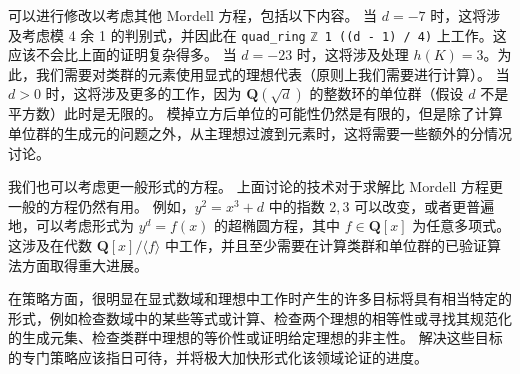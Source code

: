 \documentclass[sigplan,10pt,nonacm,
screen]{acmart} \settopmatter{printfolios=true,printccs=false,printacmref=false}
\newcommand{\ab}[1]{\todo[color=green]{AB: #1}}
\newcommand{\QQ}{\mathbf{Q}}
\newcommand{\ZZ}{\mathbf{Z}}
\begin{document}
可以进行修改以考虑其他 Mordell 方程，包括以下内容。
%
%
当 $d = -7$ 时，这将涉及考虑模 4 余 1 的判别式，并因此在 \lstinline{quad_ring} %
\lstinline{ℤ 1 ((d - 1) / 4)} 上工作。这应该不会比上面的证明复杂得多。 %
%
当 $d=-23$ 时，这将涉及处理 $h(K)=3$。为此，我们需要对类群的元素使用显式的理想代表（原则上我们需要进行计算）。
%
%
当 $d > 0$ 时，这将涉及更多的工作，因为 $\QQ(\sqrt{d})$ 的整数环的单位群（假设 $d$ 不是平方数）此时是无限的。 %
模掉立方后单位的可能性仍然是有限的，但是除了计算单位群的生成元的问题之外，从主理想过渡到元素时，这将需要一些额外的分情况讨论。

我们也可以考虑更一般形式的方程。
上面讨论的技术对于求解比 Mordell 方程更一般的方程仍然有用。
例如，$y^2 = x^3 +d$ 中的指数 $2,3$ 可以改变，或者更普遍地，可以考虑形式为 $y^d = f(x)$ 的超椭圆方程，其中 $f \in \QQ[x]$ 为任意多项式。
这涉及在代数 $\QQ[x]/\langle f\rangle$ 中工作，并且至少需要在计算类群和单位群的已验证算法方面取得重大进展。

在策略方面，很明显在显式数域和理想中工作时产生的许多目标将具有相当特定的形式，例如检查数域中的某些等式或计算、检查两个理想的相等性或寻找其规范化的生成元集、检查类群中理想的等价性或证明给定理想的非主性。
解决这些目标的专门策略应该指日可待，并将极大加快形式化该领域论证的进度。
\end{document}
